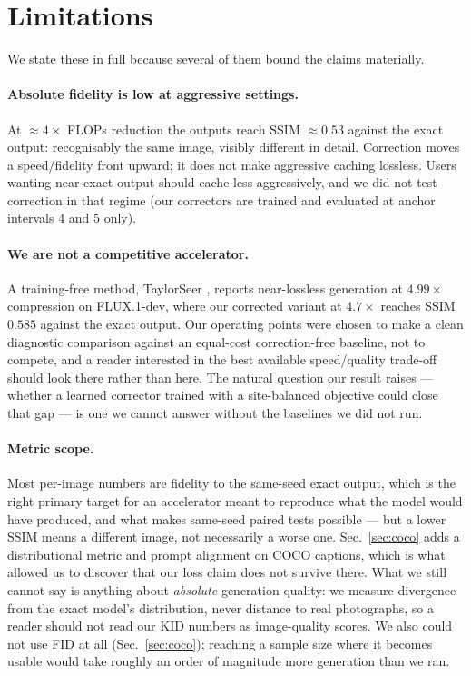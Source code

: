 
\section{Limitations}
\label{sec:limits}

We state these in full because several of them bound the claims materially.

\paragraph{Absolute fidelity is low at aggressive settings.} At $\approx\!4\times$
FLOPs reduction the outputs reach SSIM $\approx\!0.53$ against the exact output:
recognisably the same image, visibly different in detail. Correction moves a
speed/fidelity front upward; it does not make aggressive caching lossless. Users
wanting near-exact output should cache less aggressively, and we did not test
correction in that regime (our correctors are trained and evaluated at anchor
intervals $4$ and $5$ only).

\paragraph{We are not a competitive accelerator.} A training-free method,
TaylorSeer \cite{liu2025taylorseer}, reports near-lossless generation at $4.99\times$
compression on FLUX.1-dev, where our corrected variant at $4.7\times$ reaches SSIM
$0.585$ against the exact output. Our operating points were chosen to make a clean
diagnostic comparison against an equal-cost correction-free baseline, not to compete,
and a reader interested in the best available speed/quality trade-off should look
there rather than here. The natural question our result raises --- whether a learned
corrector trained with a site-balanced objective could close that gap --- is one we
cannot answer without the baselines we did not run.

\paragraph{Metric scope.} Most per-image numbers are fidelity to the same-seed exact
output, which is the right primary target for an accelerator meant to reproduce what
the model would have produced, and what makes same-seed paired tests possible --- but a
lower SSIM means a different image, not necessarily a worse one. Sec.~\ref{sec:coco}
adds a distributional metric and prompt alignment on COCO captions, which is what
allowed us to discover that our loss claim does not survive there. What we still cannot
say is anything about \emph{absolute} generation quality: we measure divergence from the
exact model's distribution, never distance to real photographs, so a reader should not
read our KID numbers as image-quality scores. We also could not use FID
\cite{heusel2017fid} at all (Sec.~\ref{sec:coco}); reaching a sample size where it
becomes usable would take roughly an order of magnitude more generation than we ran.

